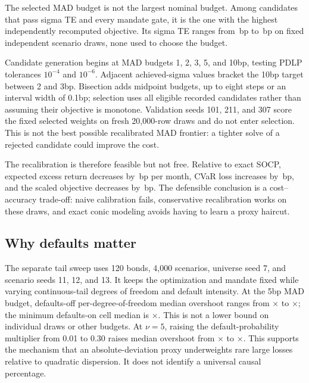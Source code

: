 \documentclass[11pt,a4paper]{article}
\begin{document}
The selected MAD budget is not the largest nominal budget. Among candidates
that pass sigma TE and every mandate gate, it is the one with the highest
independently recomputed objective. Its sigma TE ranges from
\PZeroValidationSigmaMinBp\,bp to \PZeroValidationSigmaMaxBp\,bp on
\PZeroValidationDrawCount{} fixed independent scenario draws, none used to
choose the budget.

Candidate generation begins at MAD budgets 1, 2, 3, 5, and 10bp, testing
PDLP tolerances $10^{-4}$ and $10^{-6}$. Adjacent achieved-sigma values bracket
the 10bp target between 2 and 3bp. Bisection adds midpoint budgets, up to eight
steps or an interval width of 0.1bp; selection uses all eligible recorded
candidates rather than assuming their objective is monotone. Validation
seeds 101, 211, and 307 score the fixed selected weights on fresh 20,000-row
draws and do not enter selection. This is not the best possible recalibrated
MAD frontier: a tighter solve of a rejected candidate could improve the cost.

The recalibration is therefore feasible but not free. Relative to exact SOCP,
expected excess return decreases by
\PZeroSelectedMadExpectedExcessLossBp\,bp per month, CVaR loss increases by
\PZeroSelectedMadCvarCostBp\,bp, and the scaled objective decreases by
\PZeroSelectedMadObjectiveLossBp\,bp. The defensible
conclusion is a cost--accuracy trade-off: naive calibration fails, conservative
recalibration works on these draws, and exact conic modeling avoids having to
learn a proxy haircut.

\subsection{Why defaults matter}

The separate tail sweep uses 120 bonds, 4,000 scenarios, universe seed 7,
and scenario seeds 11, 12, and 13. It keeps the optimization and mandate fixed
while varying continuous-tail degrees of freedom and default intensity.
At the 5bp MAD budget, defaults-off per-degree-of-freedom median overshoot
ranges from \MNineNoJumpOvershootMin$\times$ to
\MNineNoJumpOvershootMax$\times$; the minimum defaults-on cell median is
\MNineDefaultsOnOvershootMin$\times$. This is not a lower bound on individual
draws or other budgets. At $\nu=5$, raising the default-probability multiplier
from 0.01 to 0.30 raises median overshoot from
\MNineDoseOneOvershoot$\times$ to \MNineDoseThirtyOvershoot$\times$.
This supports the mechanism that an
absolute-deviation proxy underweights rare large losses relative to quadratic
dispersion. It does not identify a universal causal percentage.
\end{document}
